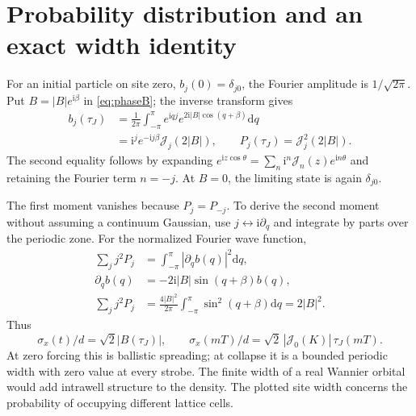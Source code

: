 \documentclass[11pt,oneside]{report}
\numberwithin{equation}{chapter}
\newcommand{\ii}{\mathrm i}
\newcommand{\dd}{\mathrm d}
\begin{document}
\section{Probability distribution and an exact width identity}
For an initial particle on site zero, $b_j(0)=\delta_{j0}$, the Fourier amplitude is $1/\sqrt{2\pi}$. Put $B=|B|e^{\ii\beta}$ in \cref{eq:phaseB}; the inverse transform gives
\begin{align}
 b_j(\tau_J)&=\frac{1}{2\pi}\int_{-\pi}^{\pi}e^{\ii qj}e^{2\ii|B|\cos(q+\beta)}\dd q\nonumber\\
 &=\ii^j e^{-\ii j\beta}\mathcal J_j(2|B|),\qquad
 P_j(\tau_J)=\mathcal J_j^2(2|B|).\label{eq:probBessel}
\end{align}
The second equality follows by expanding $e^{\ii z\cos\theta}=\sum_n\ii^n\mathcal J_n(z)e^{\ii n\theta}$ and retaining the Fourier term $n=-j$. At $B=0$, the limiting state is again $\delta_{j0}$.

The first moment vanishes because $P_j=P_{-j}$. To derive the second moment without assuming a continuum Gaussian, use $j\leftrightarrow\ii\partial_q$ and integrate by parts over the periodic zone. For the normalized Fourier wave function,
\begin{align}
 \sum_jj^2P_j&=\int_{-\pi}^{\pi}|\partial_qb(q)|^2\dd q,\\
 \partial_qb(q)&=-2\ii|B|\sin(q+\beta)b(q),\\
 \sum_jj^2P_j&=\frac{4|B|^2}{2\pi}\int_{-\pi}^{\pi}\sin^2(q+\beta)\dd q=2|B|^2.
\end{align}
Thus
\begin{equation}\label{eq:widthdelta}
 \boxed{\sigma_x(t)/d=\sqrt2|B(\tau_J)|,\qquad
 \sigma_x(mT)/d=\sqrt2\,|\mathcal J_0(K)|\,\tau_J(mT).}
\end{equation}
At zero forcing this is ballistic spreading; at collapse it is a bounded periodic width with zero value at every strobe. The finite width of a real Wannier orbital would add intrawell structure to the density. The plotted site width concerns the probability of occupying different lattice cells.
\end{document}

